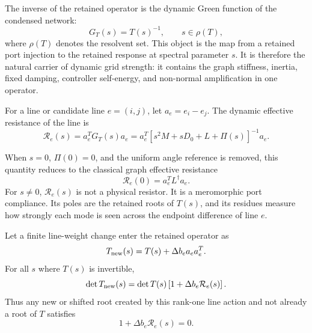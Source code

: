 The inverse of the retained operator is the dynamic Green function of the
condensed network:
\begin{equation}
  G_T(s)=T(s)^{-1},
  \qquad s\in\rho(T),
  \label{eq:self_green_function}
\end{equation}
where \(\rho(T)\) denotes the resolvent set. This object is the map from a
retained port injection to the retained response at spectral parameter \(s\).
It is therefore the natural carrier of dynamic grid strength: it contains the
graph stiffness, inertia, fixed damping, controller self-energy, and
non-normal amplification in one operator.

\begin{definition}
For a line or candidate line \(e=(i,j)\), let \(a_e=e_i-e_j\). The dynamic
effective resistance of the line is
\begin{equation}
  \mathcal R_e(s)=a_e^TG_T(s)a_e
  =
  a_e^T
  \left[
    s^2M+sD_0+L+\Pi(s)
  \right]^{-1}
  a_e .
  \label{eq:self_dynamic_resistance}
\end{equation}
\end{definition}

When \(s=0\), \(\Pi(0)=0\), and the uniform angle reference is removed, this
quantity reduces to the classical graph effective resistance
\begin{equation}
  \mathcal R_e(0)=a_e^TL^\dagger a_e .
  \label{eq:self_static_resistance_limit}
\end{equation}
For \(s\ne0\), \(\mathcal R_e(s)\) is not a physical resistor. It is a
meromorphic port compliance. Its poles are the retained roots of \(T(s)\), and
its residues measure how strongly each mode is seen across the endpoint
difference of line \(e\).

\begin{theorem}
\label{thm:self_finite_line_action}
Let a finite line-weight change enter the retained operator as
\begin{equation}
  T_{\rm new}(s)=T(s)+\Delta b_ea_ea_e^T .
  \label{eq:self_line_action_update}
\end{equation}
For all \(s\) where \(T(s)\) is invertible,
\begin{equation}
  \det T_{\rm new}(s)
  =
  \det T(s)\left[1+\Delta b_e\mathcal R_e(s)\right].
  \label{eq:self_line_action_determinant}
\end{equation}
Thus any new or shifted root created by this rank-one line action and not
already a root of \(T\) satisfies
\begin{equation}
  1+\Delta b_e\mathcal R_e(s)=0 .
  \label{eq:self_line_action_scalar}
\end{equation}
\end{theorem}

